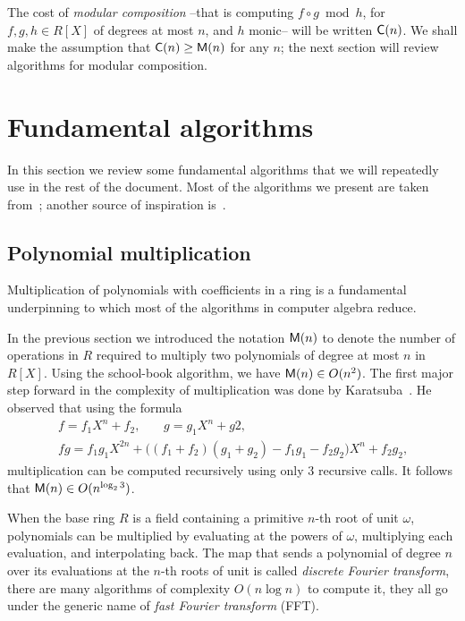 The cost of \emph{modular composition}
--that is computing $f\circ g \bmod h$, for $f,g,h\in R[X]$ of degrees
at most $n$, and $h$ monic-- will be written
$\mathsf{C}(n)$. We shall make the assumption that
$\mathsf{C}(n)\ge\mathsf{M}(n)$ for any $n$; the next section will review
algorithms for modular composition.


\section{Fundamental algorithms}
\label{sec:fund-algor}
In this section we review some fundamental algorithms that we will
repeatedly use in the rest of the document. Most of the algorithms we
present are taken from~\cite{vzGG}; another source of inspiration
is~\cite{poly-formel}.

\subsection{Polynomial multiplication}
\label{sec:polyn-mult}
Multiplication of polynomials with coefficients in a ring is a
fundamental underpinning to which most of the algorithms in computer
algebra reduce.

In the previous section we introduced the notation $\mathsf{M}(n)$ to
denote the number of operations in $R$ required to multiply two
polynomials of degree at most $n$ in $R[X]$.  Using the school-book
algorithm, we have $\mathsf{M}(n) \in O(n^2)$. The first major step forward
in the complexity of multiplication was done by Karatsuba~\cite{karatsuba}. He observed that using
the formula
\begin{gather*}
  f = f_1X^n + f_2\text{,}\qquad g = g_1X^n + g2\text{,}\\
  fg = f_1g_1X^{2n} + \bigl((f_1+f_2)(g_1+g_2)-f_1g_1-f_2g_2\bigr)X^n + f_2g_2
  \text{,}
\end{gather*}
multiplication can be computed recursively using only $3$ recursive
calls.  It follows that $\mathsf{M}(n)\in O(n^{\log_23})$.

When the base ring $R$ is a field containing a primitive $n$-th root
of unit $\omega$, polynomials can be multiplied by evaluating at the
powers of $\omega$, multiplying each evaluation, and interpolating
back. The map that sends a polynomial of degree $n$ over its
evaluations at the $n$-th roots of unit is called
\emph{discrete Fourier transform},
there are many algorithms of complexity $O(n\log n)$ to compute it,
they all go under the generic name of
\emph{fast Fourier transform}
(FFT).


